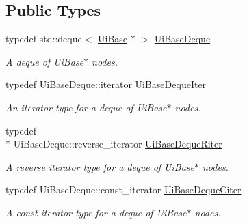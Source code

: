 \subsection*{Public Types}
\begin{DoxyCompactItemize}
\item 
\hypertarget{class_ui_base_a9a56b225c8af039ff8a5e678cf4668d2}{typedef std\-::deque$<$ \hyperlink{class_ui_base}{Ui\-Base} $\ast$ $>$ \hyperlink{class_ui_base_a9a56b225c8af039ff8a5e678cf4668d2}{Ui\-Base\-Deque}}\label{class_ui_base_a9a56b225c8af039ff8a5e678cf4668d2}

\begin{DoxyCompactList}\small\item\em A deque of Ui\-Base$\ast$ nodes. \end{DoxyCompactList}\item 
\hypertarget{class_ui_base_a99faa194bc56775ee6d2304093ef27a2}{typedef Ui\-Base\-Deque\-::iterator \hyperlink{class_ui_base_a99faa194bc56775ee6d2304093ef27a2}{Ui\-Base\-Deque\-Iter}}\label{class_ui_base_a99faa194bc56775ee6d2304093ef27a2}

\begin{DoxyCompactList}\small\item\em An iterator type for a deque of Ui\-Base$\ast$ nodes. \end{DoxyCompactList}\item 
\hypertarget{class_ui_base_a53ee609f4ed04af64913c073cd13037a}{typedef \\*
Ui\-Base\-Deque\-::reverse\-\_\-iterator \hyperlink{class_ui_base_a53ee609f4ed04af64913c073cd13037a}{Ui\-Base\-Deque\-Riter}}\label{class_ui_base_a53ee609f4ed04af64913c073cd13037a}

\begin{DoxyCompactList}\small\item\em A reverse iterator type for a deque of Ui\-Base$\ast$ nodes. \end{DoxyCompactList}\item 
\hypertarget{class_ui_base_a2e4fc2ca9076cc7c26ecefec9d3d5476}{typedef Ui\-Base\-Deque\-::const\-\_\-iterator \hyperlink{class_ui_base_a2e4fc2ca9076cc7c26ecefec9d3d5476}{Ui\-Base\-Deque\-Citer}}\label{class_ui_base_a2e4fc2ca9076cc7c26ecefec9d3d5476}

\begin{DoxyCompactList}\small\item\em A const iterator type for a deque of Ui\-Base$\ast$ nodes. \end{DoxyCompactList}\end{DoxyCompactItemize}
